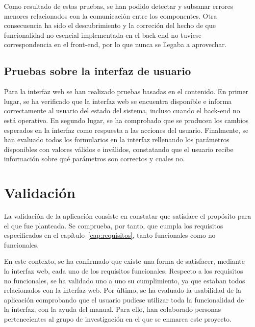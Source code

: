 Como resultado de estas pruebas, se han podido detectar y subsanar errores menores relacionados con la comunicación entre los componentes.
Otra consecuencia ha sido el descubrimiento y la correción del hecho de que funcionalidad no esencial implementada en el \gls{back-end} no tuviese correspondencia en el \gls{front-end}, por lo que nunca se llegaba a aprovechar.

\subsection*{Pruebas sobre la interfaz de usuario\label{ssec:pb:interfaz}}

Para la interfaz web se han realizado pruebas basadas en el contenido.
En primer lugar, se ha verificado que la interfaz web se encuentra disponible e informa correctamente al usuario del estado del sistema, incluso cuando el \gls{back-end} no está operativo.
En segundo lugar, se ha comprobado que se producen los cambios esperados en la interfaz como respuesta a las acciones del usuario.
Finalmente, se han evaluado todos los formularios en la interfaz rellenando los parámetros disponibles con valores válidos e inválidos, constatando que el usuario recibe información sobre qué parámetros son correctos y cuales no.

\section{Validación\label{sec:pb:validacion}}

La validación de la aplicación consiste en constatar que satisface el propósito para el que fue planteada.
Se comprueba, por tanto, que cumpla los requisitos especificados en el capítulo~\ref{cap:requisitos}, tanto funcionales como no funcionales.

En este contexto, se ha confirmado que existe una forma de satisfacer, mediante la interfaz web, cada uno de los requisitos funcionales.
Respecto a los requisitos no funcionales, se ha validado uno a uno su cumplimiento, ya que estaban todos relacionados con la interfaz web.
Por último, se ha evaluado la usabilidad de la aplicación comprobando que el usuario pudiese utilizar toda la funcionalidad de la interfaz, con la ayuda del manual.
Para ello, han colaborado personas pertenecientes al grupo de investigación en el que se enmarca este proyecto.
